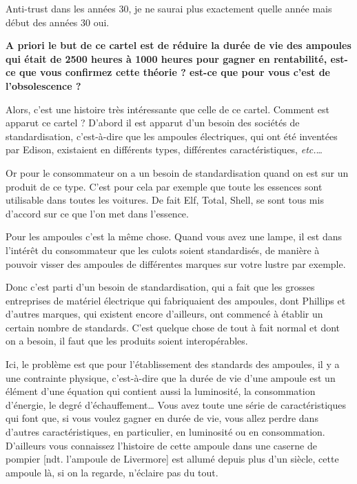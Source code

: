 \begin{small}
Anti-trust dans les années 30, je ne saurai plus exactement quelle année mais début des années 30 oui. 


\smallbreak\textbf{A priori le but de ce cartel est de réduire la durée de vie des ampoules qui était de 2500 heures à 1000 heures pour gagner en rentabilité, est-ce que vous confirmez cette théorie ? est-ce que pour vous c'est de l'obsolescence ?}\smallbreak

Alors, c'est une histoire très intéressante que celle de ce cartel. Comment est apparut ce cartel ? D'abord il est apparut d'un besoin des sociétés de standardisation, c'est-à-dire que les ampoules électriques, qui ont été inventées par Edison, existaient en différents types, différentes caractéristiques, \textit{etc.}\dots


Or pour le consommateur on a un besoin de standardisation quand on est sur un produit de ce type. C'est pour cela par exemple que toute les essences sont utilisable dans toutes les voitures.
De fait Elf, Total, Shell, se sont tous mis d'accord sur ce que l'on met dans l'essence. 

Pour les ampoules c'est la même chose. Quand vous avez une lampe, il est dans l'intérêt du consommateur que les culots soient standardisés, de manière à pouvoir visser des ampoules de différentes marques sur votre lustre par exemple.

\smallbreak

Donc c'est parti d'un besoin de standardisation, qui a fait que les grosses entreprises de matériel électrique qui fabriquaient des ampoules,  dont Phillips et d'autres marques, qui existent encore d'ailleurs, ont commencé à établir un certain nombre de standards.
C'est quelque chose de tout à fait normal et dont on a besoin, il faut que les produits soient interopérables.

\smallbreak

Ici, le problème est que pour l'établissement des standards des ampoules, il y a une contrainte physique, c'est-à-dire que la durée de vie d'une ampoule est un élément d'une équation qui contient aussi la luminosité, la consommation d'énergie, le degré d'échauffement\dots
Vous avez toute une série de caractéristiques qui font que, si vous voulez gagner en durée de vie, vous allez perdre dans d'autres caractéristiques, en particulier, en luminosité ou en consommation. D'ailleurs vous connaissez l'histoire de cette ampoule dans une caserne de pompier [ndt. l'ampoule de Livermore] est allumé depuis plus d'un siècle, cette ampoule là, si on la regarde, n'éclaire pas du tout.


\end{small}
